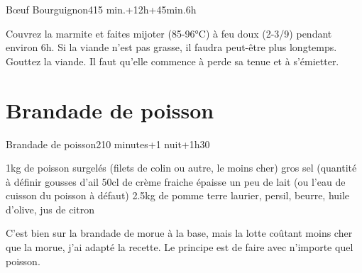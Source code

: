 {\begin{recette}{Bœuf Bourguignon}{4}{15 min.+12h+45min.}{6h}
\begin{cuisson}
Couvrez la marmite et faites mijoter (85-96°C) à feu doux (2-3/9) pendant environ 6h. Si la viande n'est pas grasse, il faudra peut-être plus longtemps. Gouttez la viande. Il faut qu'elle commence à perde sa tenue et à s'émietter.
\end{cuisson}
\end{recette}

\section{Brandade de poisson}
\begin{recette}{Brandade de poisson}{2}{10 minutes+1 nuit+1h30}{}
\begin{ingredients}
\ingredient 1kg de poisson surgelés (filets de colin ou autre, le moins cher)
\ingredient gros sel (quantité à définir
 gousses d'ail
\ingredient 50cl de crème fraiche épaisse
\ingredient un peu de lait (ou l'eau de cuisson du poisson à défaut)
\ingredient 2.5kg de pomme terre
\ingredient laurier, persil, beurre, huile d'olive, jus de citron
\end{ingredients}

\begin{remarque}
C'est bien sur la brandade de morue à la base, mais la lotte coûtant moins cher que la morue, j'ai adapté la recette. Le 
principe est de faire avec n'importe quel poisson.
\end{remarque}



\end{recette}}
